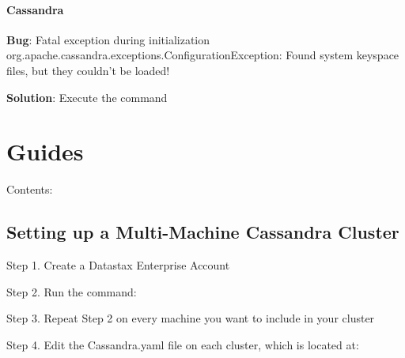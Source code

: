 \documentclass[letterpaper,12pt,english]{sphinxmanual}
\begin{document}
\subsubsection{Cassandra}
\label{fixedbugs:cassandra}
\begin{DUlineblock}{0em}
\item[] \textbf{Bug}: Fatal exception during initialization org.apache.cassandra.exceptions.ConfigurationException: Found system keyspace files, but they couldn't be loaded!
\end{DUlineblock}

\begin{DUlineblock}{0em}
\item[] \textbf{Solution}: Execute the command 
\end{DUlineblock}


\chapter{Guides}
\label{guides::doc}\label{guides:guides}
Contents:


\section{Setting up a Multi-Machine Cassandra Cluster}
\label{cassandra:setting-up-a-multi-machine-cassandra-cluster}\label{cassandra::doc}
\begin{DUlineblock}{0em}
\item[] Step 1. Create a Datastax Enterprise Account
\end{DUlineblock}

\begin{DUlineblock}{0em}
\item[] Step 2. Run the command:
\end{DUlineblock}


\begin{DUlineblock}{0em}
\item[] Step 3. Repeat Step 2 on every machine you want to include in your cluster
\end{DUlineblock}

\begin{DUlineblock}{0em}
\item[] Step 4. Edit the Cassandra.yaml file on each cluster, which is located at:
\end{DUlineblock}
\end{document}
